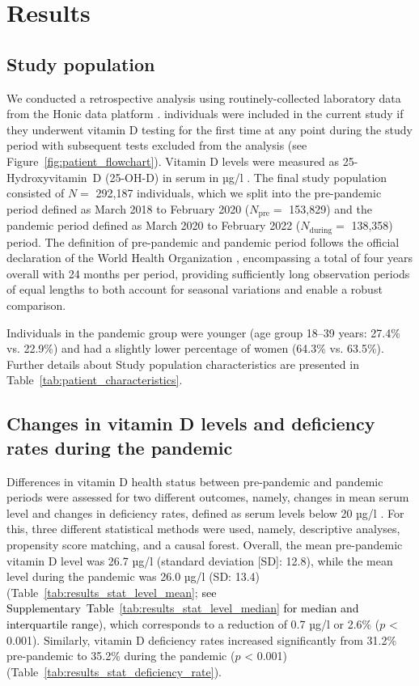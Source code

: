 \documentclass[12pt]{article}
\newcommand{\REV}[1]{\textcolor{black}{#1}}
\begin{document}

\section*{Results}
\label{sec:results}


\subsection*{Study population}

We conducted a retrospective analysis using routinely-collected laboratory data from the Honic data platform \cite{honic}. individuals were included in the current study if they underwent vitamin D testing for the first time at any point during the study period with subsequent tests excluded from the analysis (see Figure~\ref{fig:patient_flowchart}). Vitamin D levels were measured as 25-Hydroxyvitamin~D (25-OH-D) in serum in µg/l  \cite{Rabenberg2018}.  The final study population consisted of $N=$ 292,187 individuals, which we split into the pre-pandemic period defined as March 2018 to February 2020 ($N_\text{pre} =$ 153,829) and the pandemic period defined as March 2020 to February 2022 ($N_\text{during} =$ 138,358) period. The definition of pre-pandemic and pandemic period follows the official declaration of the World Health Organization \cite{who},  encompassing a total of four years overall with 24 months per period, providing sufficiently long observation periods of equal lengths to both account for seasonal variations and enable a robust comparison. 

Individuals in the pandemic group were younger (age group 18--39 years: 27.4\% vs. 22.9\%) and had a slightly lower percentage of women (64.3\% vs. 63.5\%). Further details about Study population characteristics are presented in Table~\ref{tab:patient_characteristics}.



\subsection*{Changes in vitamin D levels and deficiency rates during the pandemic}


Differences in vitamin D health status between pre-pandemic and pandemic periods were assessed for two different outcomes, namely, changes in mean serum level and changes in deficiency rates, defined as serum levels below 20 µg/l \cite{Holick2011}. For this, three different statistical methods were used, namely, descriptive analyses, propensity score matching, and a causal forest. Overall, the mean pre-pandemic vitamin D level was 26.7 µg/l (standard deviation [SD]: 12.8), while the mean level during the pandemic was 26.0 µg/l (SD: 13.4) (Table~\ref{tab:results_stat_level_mean}; \REV{see Supplementary~Table~\ref{tab:results_stat_level_median} for median and interquartile range}), which corresponds to a reduction of 0.7 µg/l or 2.6\% ($p$ < 0.001). Similarly, vitamin D deficiency rates increased significantly from 31.2\% pre-pandemic to 35.2\% during the pandemic ($p$ < 0.001) (Table~\ref{tab:results_stat_deficiency_rate}). 
\end{document}
